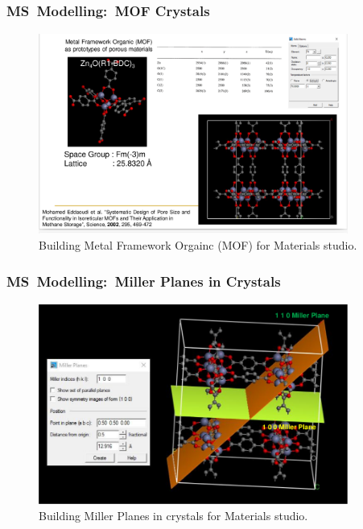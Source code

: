 \frame
{
	\frametitle{\textrm{MS~Modelling:~MOF Crystals}}
\begin{figure}[h!]
\centering
\vspace*{-0.18in}
\includegraphics[height=2.60in,width=4.00in,viewport=0 0 1148 740,clip]{Figures/MS-Building_MOF.png}
\caption{\tiny \textrm{Building Metal Framework Orgainc (MOF) for Materials studio.}}%
\label{MS-Building_MOF}
\end{figure}
}

\frame
{
	\frametitle{\textrm{MS~Modelling:~Miller Planes in Crystals}}
\begin{figure}[h!]
\centering
\vspace*{-0.18in}
\includegraphics[height=2.60in,width=4.00in,viewport=0 0 880 569,clip]{Figures/MS-Building_Miller_Plane.png}
\caption{\tiny \textrm{Building Miller Planes in crystals for Materials studio.}}%
\label{MS-Building_Miller-Plane}
\end{figure}
}

